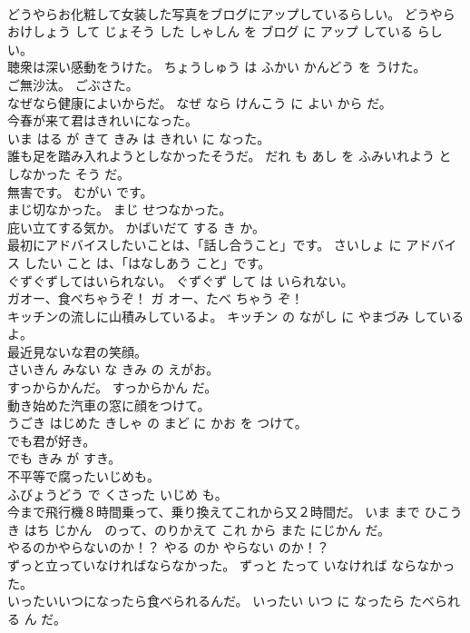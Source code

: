 \documentclass[8pt]{extreport}
\begin{document}
\begin{CJK}{UTF8}{min}
\\	どうやらお化粧して女装した写真をブログにアップしているらしい。	どうやら おけしょう して じょそう した しゃしん を ブログ に アップ している らしい。	
\\	聴衆は深い感動をうけた。	ちょうしゅう は ふかい かんどう を うけた。	
\\	ご無沙汰。	ごぶさた。	
\\	なぜなら健康によいからだ。	なぜ なら けんこう に よい から だ。	
\\	今春が来て君はきれいになった。	
\\	いま はる が きて きみ は きれい に なった。	
\\	誰も足を踏み入れようとしなかったそうだ。	だれ も あし を ふみいれよう と しなかった そう だ。	
\\	無害です。	むがい です。	
\\	まじ切なかった。	まじ せつなかった。	
\\	庇い立てする気か。	かばいだて する き か。	
\\	最初にアドバイスしたいことは、「話し合うこと」です。	さいしょ に アドバイス したい こと は、「はなしあう こと」です。	
\\	ぐずぐずしてはいられない。	ぐずぐず して は いられない。	
\\	ガオー、食べちゃうぞ！	ガ オー、たべ ちゃう ぞ！	
\\	キッチンの流しに山積みしているよ。	キッチン の ながし に やまづみ している よ。	
\\	最近見ないな君の笑顔。	
\\	さいきん みない な きみ の えがお。	
\\	すっからかんだ。	すっからかん だ。	
\\	動き始めた汽車の窓に顔をつけて。	
\\	うごき はじめた きしゃ の まど に かお を つけて。	
\\	でも君が好き。	
\\	でも きみ が すき。	
\\	不平等で腐ったいじめも。	
\\	ふびょうどう で くさった いじめ も。	
\\	今まで飛行機８時間乗って、乗り換えてこれから又２時間だ。	いま まで ひこうき はち じかん　のって、のりかえて これ から また にじかん だ。	
\\	やるのかやらないのか！？	やる のか やらない のか！？	
\\	ずっと立っていなければならなかった。	ずっと たって いなければ ならなかった。	
\\	いったいいつになったら食べられるんだ。	いったい いつ に なったら たべられる ん だ。	

\end{CJK}
\end{document}
